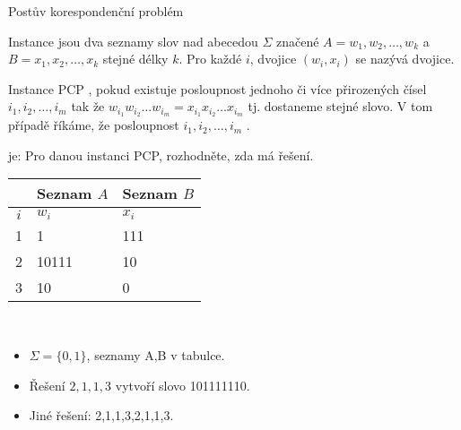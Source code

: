     
    
    \begin{frame}{Postův korespondenční problém}
    \begin{definition}
    Instance  jsou dva seznamy slov nad abecedou $\Sigma$ značené $A=w_1,w_2,\ldots, w_k$ a $B=x_1,x_2,\ldots, x_k$ stejné délky $k$. 
    \pause
    Pro každé $i$, dvojice $(w_i,x_i) $ se nazývá  dvojice. 
    \pause
    
    Instance PCP , pokud existuje posloupnost jednoho či více přirozených čísel ${i_1}, {i_2}, \ldots, {i_m}$ tak že $w_{i_1} w_{i_2} \ldots w_{i_m}=x_{i_1} x_{i_2} \ldots x_{i_m} $ tj. dostaneme stejné slovo.
    \pause
    V tom případě říkáme, že posloupnost ${i_1}, {i_2}, \ldots, {i_m}$  .
    \pause
    
     je: Pro danou instanci PCP, rozhodněte, zda má řešení.
    \end{definition}
    \pause
    \begin{example}
    \begin{minipage}{0.37\textwidth}
    \begin{tabular}{c | l | l}
     & Seznam $A$ & Seznam $B$\\
    \hline
    $i$ & $w_i$ & $x_i$ \\
    \hline
    1 & 1 & 111\\
    2 & 10111 & 10\\
    3 & 10 & 0 
    \end{tabular}
    \end{minipage}
    \begin{minipage}{0.01\textwidth}
    \ \end{minipage}
    \begin{minipage}{0.51\textwidth}
    \begin{itemize}
        \item $\Sigma=\{0,1\}$, seznamy A,B v tabulce.
        \item Řešení $2,1,1,3$ vytvoří slovo 101111110.
        \item Jiné řešení: 2,1,1,3,2,1,1,3.
    \end{itemize}
    \end{minipage}
    \end{example}
    \end{frame}
    
